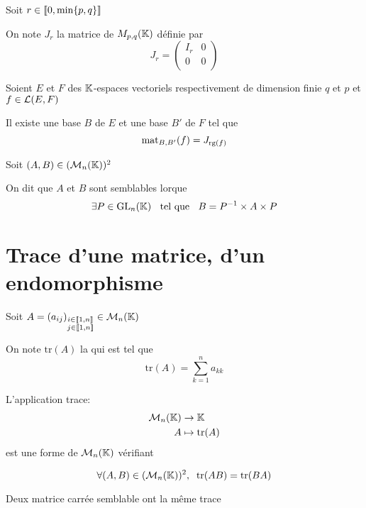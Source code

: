 \begin{dfn}
Soit $r \in \lib 0, \min \{p, q\} \rib$

On note $J_r$ la matrice de $M_{p, q}(\K)$ définie par
\[
    J_r = \begin{pmatrix}
        I_r & 0 \\
        0   & 0 \\
    \end{pmatrix}
\]
\end{dfn}

\begin{prp}
Soient $E$ et $F$ des $\K$-espaces vectoriels respectivement de dimension
finie $q$ et $p$ et $f \in \Lin(E, F)$

Il existe une base $B$ de $E$ et une base $B'$ de $F$ tel que
\[
    \mat_{B, B'}(f) = J_{\rang(f)}
\]
\end{prp}

\begin{dfn}
Soit $(A, B) \in (\M_n(\K))^2$

On dit que $A$ et $B$ sont semblables lorque
\[
    \exists P \in \mathrm{GL}_n(\K) \tq B = P^{-1} \times A \times P
\]
\end{dfn}



\section{Trace d'une matrice, d'un endomorphisme}

\begin{dfn}
Soit $A = (a_{ij})_{\mind{i}{j}{n}{n}} \in \M_n(\K)$

On note $\mathrm{tr}(A)$ la  qui est tel que
\[
    \mathrm{tr}(A) = \sum^n_{k = 1} a_{kk}
\]
\end{dfn}

\begin{prp}
L'application trace:
\begin{align*}
    \M_n(\K) &\to \K \\
    A &\mapsto \mathrm{tr}(A) 
\end{align*}
est une forme de $\M_n(\K)$ vérifiant

\[
    \forall (A, B) \in (\M_n(\K))^2, \;\; \mathrm{tr}(AB) = \mathrm{tr}(BA)
\]
\end{prp}

\begin{prp}
Deux matrice carrée semblable ont la même trace
\end{prp}


